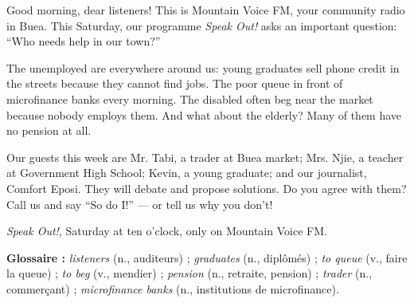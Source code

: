 \documentclass[11pt]{article}
\begin{document}
\begin{textebox}
Good morning, dear listeners! This is Mountain Voice FM, your community radio in Buea. This Saturday, our programme \emph{Speak Out!} asks an important question: “Who needs help in our town?”

The unemployed are everywhere around us: young graduates sell phone credit in the streets because they cannot find jobs. The poor queue in front of microfinance banks every morning. The disabled often beg near the market because nobody employs them. And what about the elderly? Many of them have no pension at all.

Our guests this week are Mr. Tabi, a trader at Buea market; Mrs. Njie, a teacher at Government High School; Kevin, a young graduate; and our journalist, Comfort Eposi. They will debate and propose solutions. Do you agree with them? Call us and say “So do I!” — or tell us why you don't!

\emph{Speak Out!}, Saturday at ten o'clock, only on Mountain Voice FM.
\end{textebox}

\textbf{Glossaire :} \emph{listeners} (n., auditeurs) ; \emph{graduates} (n., diplômés) ; \emph{to queue} (v., faire la queue) ; \emph{to beg} (v., mendier) ; \emph{pension} (n., retraite, pension) ; \emph{trader} (n., commerçant) ; \emph{microfinance banks} (n., institutions de microfinance).
\end{document}

